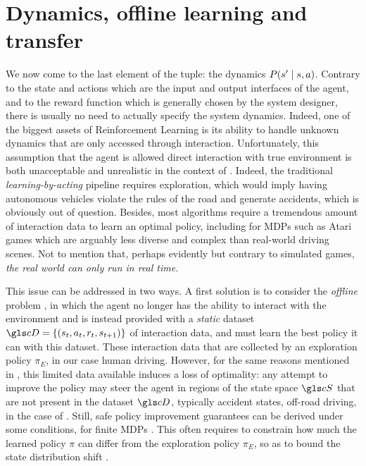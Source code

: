 \section{Dynamics, offline learning and transfer}

We now come to the last element of the  tuple: the dynamics $P\lparen s'\mid s,a\rparen$. Contrary to the state and actions which are the input and output interfaces of the agent, and to the reward function which is generally chosen by the system designer, there is usually no need to actually specify the system dynamics. Indeed, one of the biggest assets of Reinforcement Learning is its ability to handle unknown dynamics that are only accessed through interaction. Unfortunately, this assumption that the agent is allowed direct interaction with true environment is both unacceptable and unrealistic in the context of . Indeed, the traditional \emph{learning-by-acting} pipeline requires exploration, which would imply having autonomous vehicles violate the rules of the road and generate accidents, which is obviously out of question. Besides, most  algorithms require a tremendous amount of interaction data to learn an optimal policy, including for \glspl{MDP} such as Atari games which are arguably less diverse and complex than real-world driving scenes. Not to mention that, perhaps evidently but contrary to simulated games, \emph{the real world can only run in real time}.

This issue can be addressed in two ways. A first solution is to consider the \emph{offline}  problem \citep{levine2020offline}, in which the agent no longer has the ability to interact with the environment and is instead provided with a \emph{static} dataset $\cD = \{(s_t, a_t, r_t, s_{t+1})\}$ of interaction data, and must learn the best policy it can with this dataset. These interaction data that are collected by an exploration policy $\pi_E$, in our case human driving. However, for the same reasons mentioned in , this limited data available induces a loss of optimality: any attempt to improve the policy may steer the agent in regions of the state space $\cS$ that are not present in the dataset $\cD$, typically accident states, off-road driving, \etc in the case of . Still, safe policy improvement guarantees can be derived under some conditions, \eg for finite \glspl{MDP} \citep{Laroche2019,Nadjahi2019}. This often requires to constrain how much the learned policy $\pi$ can differ from the exploration policy $\pi_E$, so as to bound the state distribution shift \citep{Kakade2002,Schulman2015}.

